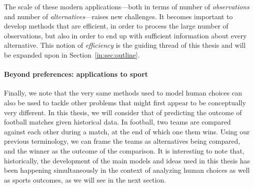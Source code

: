The scale of these modern applications---both in terms of number of \emph{observations} and number of \emph{alternatives}---raises new challenges.
It becomes important to develop methods that are efficient, in order to process the large number of observations, but also in order to end up with sufficient information about every alternative.
This notion of \emph{efficiency} is the guiding thread of this thesis and will be expanded upon in Section~\ref{in:sec:outline}.

\paragraph{Beyond preferences: applications to sport}
Finally, we note that the very same methods used to model human choices can also be used to tackle other problems that might first appear to be conceptually very different.
In this thesis, we will consider that of predicting the outcome of football matches given historical data.
In football, two teams are compared against each other during a match, at the end of which one them wins.
Using our previous terminology, we can frame the teams as alternatives being compared, and the winner as the outcome of the comparison.
It is interesting to note that, historically, the development of the main models and ideas used in this thesis has been happening simultaneously in the context of analyzing human choices as well as sports outcomes, as we will see in the next section.




